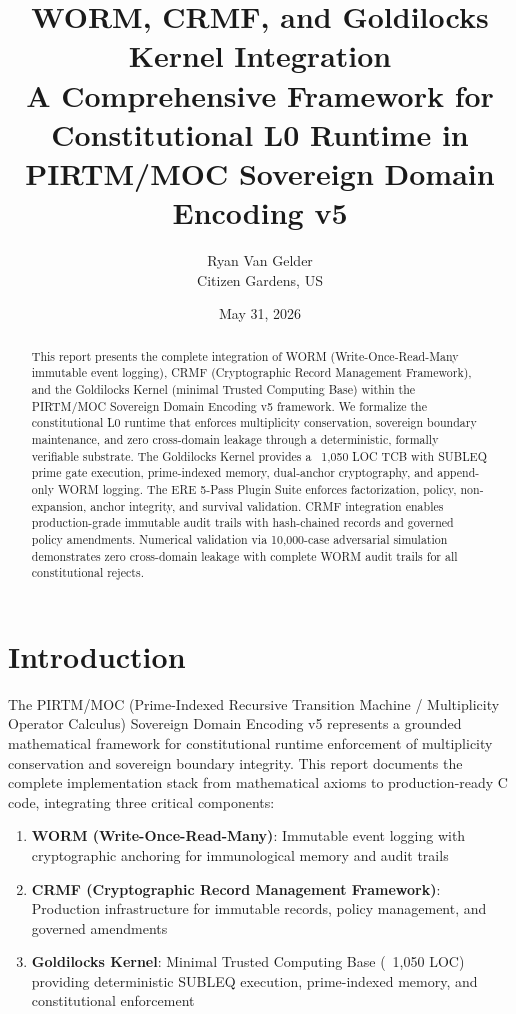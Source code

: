\documentclass[11pt,a4paper]{article}
\begin{document}
\title{\textbf{WORM, CRMF, and Goldilocks Kernel Integration}\\[0.5em]
\large A Comprehensive Framework for Constitutional L0 Runtime in PIRTM/MOC Sovereign Domain Encoding v5}
\author{Ryan Van Gelder\\Citizen Gardens, US}
\date{May 31, 2026}

\maketitle

\begin{abstract}
This report presents the complete integration of WORM (Write-Once-Read-Many immutable event logging), CRMF (Cryptographic Record Management Framework), and the Goldilocks Kernel (minimal Trusted Computing Base) within the PIRTM/MOC Sovereign Domain Encoding v5 framework. We formalize the constitutional L0 runtime that enforces multiplicity conservation, sovereign boundary maintenance, and zero cross-domain leakage through a deterministic, formally verifiable substrate. The Goldilocks Kernel provides a ~1,050 LOC TCB with SUBLEQ prime gate execution, prime-indexed memory, dual-anchor cryptography, and append-only WORM logging. The ERE 5-Pass Plugin Suite enforces factorization, policy, non-expansion, anchor integrity, and survival validation. CRMF integration enables production-grade immutable audit trails with hash-chained records and governed policy amendments. Numerical validation via 10,000-case adversarial simulation demonstrates zero cross-domain leakage with complete WORM audit trails for all constitutional rejects.
\end{abstract}
\newpage
\tableofcontents
\newpage

\section{Introduction}

The PIRTM/MOC (Prime-Indexed Recursive Transition Machine / Multiplicity Operator Calculus) Sovereign Domain Encoding v5 represents a grounded mathematical framework for constitutional runtime enforcement of multiplicity conservation and sovereign boundary integrity. This report documents the complete implementation stack from mathematical axioms to production-ready C code, integrating three critical components:

\begin{enumerate}
    \item \textbf{WORM (Write-Once-Read-Many)}: Immutable event logging with cryptographic anchoring for immunological memory and audit trails
    \item \textbf{CRMF (Cryptographic Record Management Framework)}: Production infrastructure for immutable records, policy management, and governed amendments
    \item \textbf{Goldilocks Kernel}: Minimal Trusted Computing Base (~1,050 LOC) providing deterministic SUBLEQ execution, prime-indexed memory, and constitutional enforcement
\end{enumerate}
\end{document}

